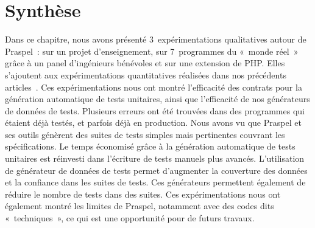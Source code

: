 \section{Synthèse}
\label{section:experimentation:other}

Dans ce chapitre, nous avons présenté 3~expérimentations qualitatives autour de
Praspel~: sur un projet d'enseignement, sur 7~programmes du «~monde réel~» grâce
à un panel d'ingénieurs bénévoles et sur une extension de PHP. Elles s'ajoutent
aux expérimentations quantitatives réalisées dans nos précédents
articles~. Ces
expérimentations nous ont montré l'efficacité des contrats pour la génération
automatique de tests unitaires, ainsi que l'efficacité de nos générateurs de
données de tests.  Plusieurs erreurs ont été trouvées dans des programmes qui
étaient déjà testés, et parfois déjà en production. Nous avons vu que Praspel et
ses outils génèrent des suites de tests simples mais pertinentes couvrant les
spécifications. Le temps économisé grâce à la génération automatique de tests
unitaires est réinvesti dans l'écriture de tests manuels plus avancés.
L'utilisation de générateur de données de tests permet d'augmenter la couverture
des données et la confiance dans les suites de tests. Ces générateurs permettent
également de réduire le nombre de tests dans des suites. Ces expérimentations
nous ont également montré les limites de Praspel, notamment avec des codes dits
«~techniques~»,  ce qui est une opportunité pour de futurs travaux.
